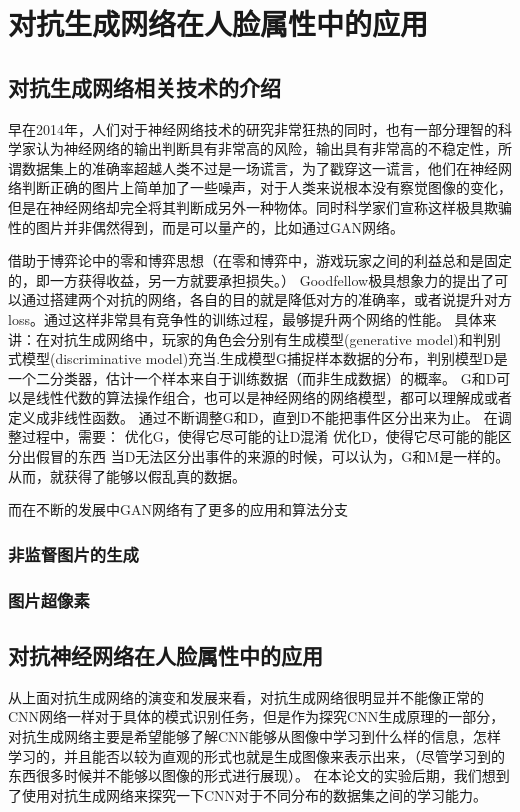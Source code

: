 \chapter{对抗生成网络在人脸属性中的应用}
\section{对抗生成网络相关技术的介绍}
早在2014年，人们对于神经网络技术的研究非常狂热的同时，也有一部分理智的科学家认为神经网络的输出判断具有非常高的风险，输出具有非常高的不稳定性，所谓数据集上的准确率超越人类不过是一场谎言，为了戳穿这一谎言，他们在神经网络判断正确的图片上简单加了一些噪声，对于人类来说根本没有察觉图像的变化，但是在神经网络却完全将其判断成另外一种物体。同时科学家们宣称这样极具欺骗性的图片并非偶然得到，而是可以量产的，比如通过GAN网络。

借助于博弈论中的零和博弈思想（在零和博弈中，游戏玩家之间的利益总和是固定的，即一方获得收益，另一方就要承担损失。）
Goodfellow极具想象力的提出了可以通过搭建两个对抗的网络，各自的目的就是降低对方的准确率，或者说提升对方loss。通过这样非常具有竞争性的训练过程，最够提升两个网络的性能。
具体来讲：在对抗生成网络中，玩家的角色会分别有生成模型(generative model)和判别式模型(discriminative model)充当.生成模型G捕捉样本数据的分布，判别模型D是一个二分类器，估计一个样本来自于训练数据（而非生成数据）的概率。
G和D可以是线性代数的算法操作组合，也可以是神经网络的网络模型，都可以理解成或者定义成非线性函数。
通过不断调整G和D，直到D不能把事件区分出来为止。
在调整过程中，需要：
优化G，使得它尽可能的让D混淆
优化D，使得它尽可能的能区分出假冒的东西
当D无法区分出事件的来源的时候，可以认为，G和M是一样的。从而，就获得了能够以假乱真的数据。

而在不断的发展中GAN网络有了更多的应用和算法分支
\subsection{非监督图片的生成}

\subsection{图片超像素}


\section{对抗神经网络在人脸属性中的应用}
从上面对抗生成网络的演变和发展来看，对抗生成网络很明显并不能像正常的CNN网络一样对于具体的模式识别任务，但是作为探究CNN生成原理的一部分，对抗生成网络主要是希望能够了解CNN能够从图像中学习到什么样的信息，怎样学习的，并且能否以较为直观的形式也就是生成图像来表示出来，（尽管学习到的东西很多时候并不能够以图像的形式进行展现）。
在本论文的实验后期，我们想到了使用对抗生成网络来探究一下CNN对于不同分布的数据集之间的学习能力。
